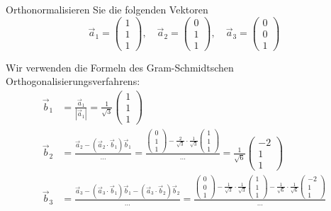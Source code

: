 Orthonormalisieren Sie die folgenden Vektoren
\[
\vec a_1=\begin{pmatrix}1\\1\\1\end{pmatrix},\quad
\vec a_2=\begin{pmatrix}0\\1\\1\end{pmatrix},\quad
\vec a_3=\begin{pmatrix}0\\0\\1\end{pmatrix}
\]

\begin{loesung}
Wir verwenden die Formeln des Gram-Schmidtschen Orthogonalisierungsverfahrens:
\begin{align*}
\vec b_1&=\frac{\vec a_1}{|\vec a_1|}=\frac1{\sqrt{3}}\begin{pmatrix}1\\1\\1\end{pmatrix}
\\
\vec b_2&=\frac{\vec a_2-(\vec a_2\cdot\vec b_1)\vec b_1}{\dots}
=
\frac{\begin{pmatrix}0\\1\\1\end{pmatrix}-\frac{2}{\sqrt{3}}\cdot\frac1{\sqrt{3}}\begin{pmatrix}1\\1\\1\end{pmatrix}}{\dots}
=
\frac1{\sqrt{6}}\begin{pmatrix}-2\\1\\1\end{pmatrix}
\\
\vec b_3
&=
\frac{\vec a_3-(\vec a_3\cdot\vec b_1)\vec b_1-(\vec a_3\cdot\vec b_2)\vec b_2}{\dots}
=
\frac{\begin{pmatrix}0\\0\\1\end{pmatrix}
-\frac1{\sqrt{3}}\cdot\frac1{\sqrt{3}}\begin{pmatrix}1\\1\\1\end{pmatrix}
-\frac1{\sqrt{6}}\cdot\frac1{\sqrt{6}}\begin{pmatrix}-2\\1\\1\end{pmatrix}}{\dots}\\

\end{align*}
\end{loesung}
